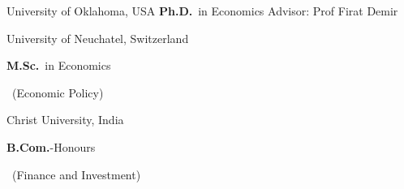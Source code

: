 	{%
		University of Oklahoma, USA}
	{%
		\textbf{Ph.D.}~in Economics}
	{%
	Advisor: Prof Firat Demir}

		{%
			University of Neuchatel, Switzerland}
		{%
			\textbf{M.Sc.}~in Economics\begin{footnotesize}
				~(Economic Policy)
			\end{footnotesize}}
		{%
		}

		{%
			Christ University, India}
		{%
			\textbf{B.Com.}-Honours\begin{footnotesize}
				~(Finance and Investment)
			\end{footnotesize}}
		{%
		}